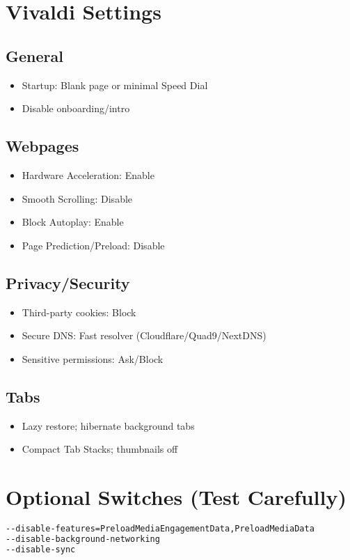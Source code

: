 \documentclass[10pt,a4paper,oneside]{book}
\begin{document}
\section{Vivaldi Settings}
\begin{multicols}{2}
\subsection{General}
\begin{itemize}
  \item Startup: Blank page or minimal Speed Dial
  \item Disable onboarding/intro
\end{itemize}

\subsection{Webpages}
\begin{itemize}
  \item Hardware Acceleration: Enable
  \item Smooth Scrolling: Disable
  \item Block Autoplay: Enable
  \item Page Prediction/Preload: Disable
\end{itemize}

\subsection{Privacy/Security}
\begin{itemize}
  \item Third-party cookies: Block
  \item Secure DNS: Fast resolver (Cloudflare/Quad9/NextDNS)
  \item Sensitive permissions: Ask/Block
\end{itemize}

\subsection{Tabs}
\begin{itemize}
  \item Lazy restore; hibernate background tabs
  \item Compact Tab Stacks; thumbnails off
\end{itemize}
\end{multicols}

\section{Optional Switches (Test Carefully)}
\begin{codebox}
\begin{lstlisting}[language=bash]
--disable-features=PreloadMediaEngagementData,PreloadMediaData
--disable-background-networking
--disable-sync
\end{lstlisting}
\end{codebox}
\end{document}
